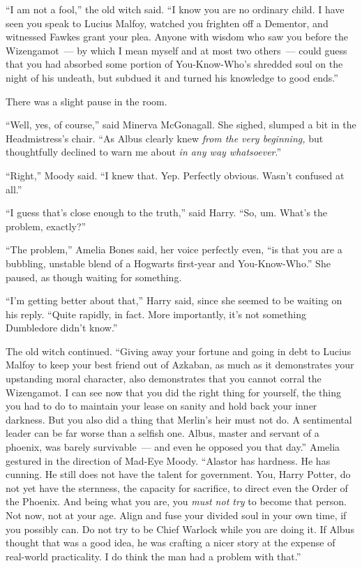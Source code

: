 ``I am not a fool,'' the old witch said. ``I know you are no ordinary child. I have seen you speak to Lucius Malfoy, watched you frighten off a Dementor, and witnessed Fawkes grant your plea. Anyone with wisdom who saw you before the Wizengamot~--- by which I mean myself and at most two others~--- could guess that you had absorbed some portion of You-Know-Who's shredded soul on the night of his undeath, but subdued it and turned his knowledge to good ends.''

There was a slight pause in the room.

``Well, yes, of course,'' said Minerva McGonagall. She sighed, slumped a bit in the Headmistress's chair. ``As Albus clearly knew \emph{from the very beginning,} but thoughtfully declined to warn me about \emph{in any way whatsoever}.''

``Right,'' Moody said. ``I knew that. Yep. Perfectly obvious. Wasn't confused at all.''

``I guess that's close enough to the truth,'' said Harry. ``So, um. What's the problem, exactly?''

``The problem,'' Amelia Bones said, her voice perfectly even, ``is that you are a bubbling, unstable blend of a Hogwarts first-year and You-Know-Who.'' She paused, as though waiting for something.

``I'm getting better about that,'' Harry said, since she seemed to be waiting on his reply. ``Quite rapidly, in fact. More importantly, it's not something Dumbledore didn't know.''

The old witch continued. ``Giving away your fortune and going in debt to Lucius Malfoy to keep your best friend out of Azkaban, as much as it demonstrates your upstanding moral character, also demonstrates that you cannot corral the Wizengamot. I can see now that you did the right thing for yourself, the thing you had to do to maintain your lease on sanity and hold back your inner darkness. But you also did a thing that Merlin's heir must not do. A sentimental leader can be far worse than a selfish one. Albus, master and servant of a phoenix, was barely survivable~--- and even he opposed you that day.'' Amelia gestured in the direction of Mad-Eye Moody. ``Alastor has hardness. He has cunning. He still does not have the talent for government. You, Harry Potter, do not yet have the sternness, the capacity for sacrifice, to direct even the Order of the Phoenix. And being what you are, you \emph{must not try} to become that person. Not now, not at your age. Align and fuse your divided soul in your own time, if you possibly can. Do not try to be Chief Warlock while you are doing it. If Albus thought that was a good idea, he was crafting a nicer story at the expense of real-world practicality. I do think the man had a problem with that.''

